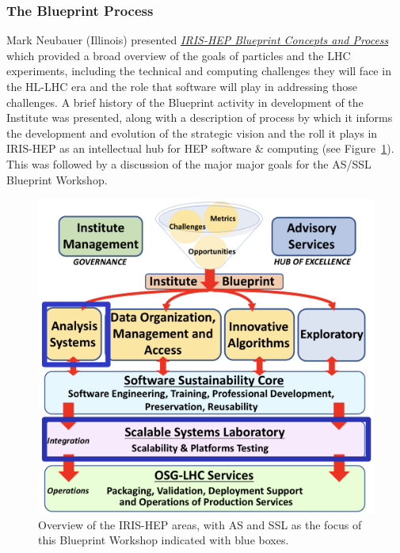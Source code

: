 \documentclass[11pt,letterpaper,fleqn]{article}
\begin{document}
\subsubsection{The Blueprint Process}
\vspace{0.2cm}
Mark Neubauer (Illinois) presented \href{https://indico.cern.ch/event/820946/contributions/3461588/attachments/1866577/3069573/IRIS-HEP_BluePrint_AS_SSL.pdf}{\it IRIS-HEP Blueprint Concepts and Process} which provided a broad overview of the goals of particles and the LHC experiments, including the technical and computing challenges they will face in the HL-LHC era and the role that software will play in addressing those challenges. A brief history of the Blueprint activity in development of the Institute was presented, along with a description of process by which it informs the development and evolution of the strategic vision and the roll it plays in IRIS-HEP as an intellectual hub for HEP software \& computing (see Figure~\ref{fig:overview}). This was followed by a discussion of the major major goals for the AS/SSL Blueprint Workshop. \begin{figure}
  \centering
  \vspace{-0.4cm}
  \includegraphics[width=0.99\linewidth]{figures/AS_SSL_IRIS-HEP.png}
  \vspace{-0.7cm}
  \caption{Overview of the IRIS-HEP areas, with AS and SSL as the focus of this Blueprint Workshop indicated with blue boxes.}
  \label{fig:overview}
\end{figure}
\end{document}
